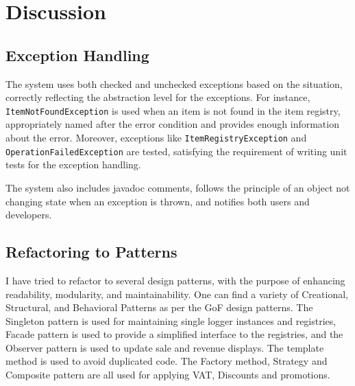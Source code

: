 \documentclass[a4paper]{scrreprt}
\begin{document}
%
\chapter{Discussion}
\label{sec:discussion}
\section*{Exception Handling}
The system uses both checked and unchecked exceptions based on the situation, correctly
reflecting the abstraction level for the exceptions.
For instance, \texttt{ItemNotFoundException} is used when an item is not found in the item registry,
appropriately named after the error condition and provides enough information about the error.
Moreover, exceptions like
\texttt{ItemRegistryException} and
\texttt{OperationFailedException} are tested,
satisfying the requirement of writing unit tests for the exception handling.

The system also includes javadoc comments, follows the principle of an object not changing state when an exception is thrown,
and notifies both users and developers.

\section*{Refactoring to Patterns}
I have tried to refactor to several design patterns, with the purpose of enhancing readability, modularity, and maintainability.
One can find a variety of Creational, Structural, and Behavioral Patterns as per the GoF design patterns.
The Singleton pattern is used for maintaining single logger instances and registries,
Facade pattern is used to provide a simplified interface to the registries,
and the Observer pattern is used to update sale and revenue displays.
The template method is used to avoid duplicated code.
The Factory method, Strategy and Composite pattern are all used for applying VAT, Discounts and promotions.
\end{document}
